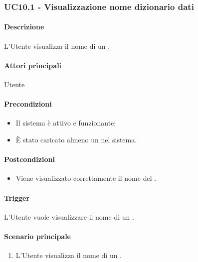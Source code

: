
\subsubsection{UC10.1 - Visualizzazione nome dizionario dati}\label{UC10point1}
\paragraph*{Descrizione}
L'Utente visualizza il nome di un .

\paragraph*{Attori principali}
Utente

\paragraph*{Precondizioni}
\begin{itemize}
  \item Il sistema è attivo e funzionante;
  \item È stato caricato almeno un  nel sistema. 
\end{itemize}

\paragraph*{Postcondizioni}
\begin{itemize}
  \item Viene visualizzato correttamente il nome del .
\end{itemize}

\paragraph*{Trigger}
L'Utente vuole visualizzare il nome di un .

\paragraph*{Scenario principale}
\begin{enumerate}
  \item L'Utente visualizza il nome di un .
\end{enumerate}

